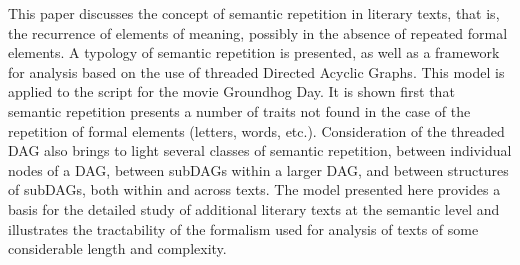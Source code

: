 This paper discusses the concept of semantic repetition in literary texts, that is, the recurrence of elements of meaning, possibly in the absence of repeated
 formal elements. A typology of semantic repetition is presented, as well as a
 framework for analysis based on the use of threaded Directed Acyclic Graphs.
 This
 model is applied to the script for the movie Groundhog Day. It is shown first
 that semantic repetition presents a number of traits not found in the case of
 the repetition of formal elements (letters, words, etc.). Consideration of the
 threaded DAG also brings to light several classes of semantic repetition,
 between individual nodes of a DAG, between subDAGs within a larger DAG, and
 between structures of subDAGs, both within and across texts. The model
 presented here provides a basis for the detailed study of additional literary
 texts at the semantic level and illustrates the tractability of the formalism
 used for analysis of texts of some considerable length and complexity.

